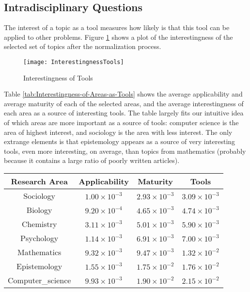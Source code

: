 \subsection{Intradisciplinary Questions}

The interest of a topic as a tool measures how likely is that this
tool can be applied to other problems. Figure \ref{fig:Interestingness-of-Tools}
shows a plot of the interestingness of the selected set of topics
after the normalization process.

\begin{figure}[h]
\centering\texttt{[image: InterestingnessTools]}
\caption{\label{fig:Interestingness-of-Tools}Interestingness of Tools}
\end{figure}

Table \ref{tab:Interestingness-of-Areas-as-Tools} shows the average applicability and average maturity of each of the selected areas, and the average interestingness of each area as a source of interesting tools. The table largely fits our intuitive idea of which areas are more important as a source of tools: computer science is the area of highest interest, and sociology is the area with less interest. The only extrange elements is that epistemology appears as a source of very interesting tools, even more interesting, on average, than topics from mathematics (probably because it contains a large ratio of poorly written articles).

\begin{table*}
\begin{centering}
\begin{tabular}{|c|c|c|c|}
\hline 
Research Area & Applicability & Maturity & Tools\tabularnewline
\hline 
\hline 
Sociology & $1.00\times10^{-3}$ & $2.93\times10^{-3}$ & $3.09\times10^{-3}$\tabularnewline
\hline 
Biology & $9.20\times10^{-4}$ & $4.65\times10^{-3}$ & $4.74\times10^{-3}$\tabularnewline
\hline 
Chemistry & $3.11\times10^{-3}$ & $5.01\times10^{-3}$ & $5.90\times10^{-3}$\tabularnewline
\hline 
Psychology & $1.14\times10^{-3}$ & $6.91\times10^{-3}$ & $7.00\times10^{-3}$\tabularnewline
\hline 
Mathematics & $9.32\times10^{-3}$ & $9.47\times10^{-3}$ & $1.32\times10^{-2}$\tabularnewline
\hline 
Epistemology & $1.55\times10^{-3}$ & $1.75\times10^{-2}$ & $1.76\times10^{-2}$\tabularnewline
\hline 
Computer\_science & $9.93\times10^{-3}$ & $1.90\times10^{-2}$ & $2.15\times10^{-2}$\tabularnewline
\hline 
\end{tabular}
\par\end{centering}

\caption{\label{tab:Interestingness-of-Areas-as-Tools}Interestingness of Areas
as Tools}
\end{table*}

